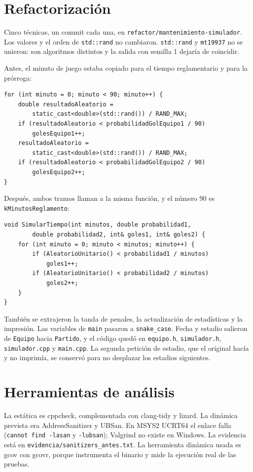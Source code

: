 \documentclass[10pt,a4paper]{article}
\begin{document}
\section{Refactorizaci\'on}
Cinco t\'ecnicas, un commit cada una, en \texttt{refactor/mantenimiento-simulador}. Los valores y el orden de \texttt{std::rand} no cambiaron. \texttt{std::rand} y \texttt{mt19937} no se unieron: son algoritmos distintos y la salida con semilla 1 dejar\'ia de coincidir.

Antes, el minuto de juego estaba copiado para el tiempo reglamentario y para la pr\'orroga:

\begin{lstlisting}
for (int minuto = 0; minuto < 90; minuto++) {
    double resultadoAleatorio =
        static_cast<double>(std::rand()) / RAND_MAX;
    if (resultadoAleatorio < probabilidadGolEquipo1 / 90)
        golesEquipo1++;
    resultadoAleatorio =
        static_cast<double>(std::rand()) / RAND_MAX;
    if (resultadoAleatorio < probabilidadGolEquipo2 / 90)
        golesEquipo2++;
}
\end{lstlisting}

Despu\'es, ambos tramos llaman a la misma funci\'on, y el n\'umero 90 es \texttt{kMinutosReglamento}:

\begin{lstlisting}
void SimularTiempo(int minutos, double probabilidad1,
        double probabilidad2, int& goles1, int& goles2) {
    for (int minuto = 0; minuto < minutos; minuto++) {
        if (AleatorioUnitario() < probabilidad1 / minutos)
            goles1++;
        if (AleatorioUnitario() < probabilidad2 / minutos)
            goles2++;
    }
}
\end{lstlisting}

Tambi\'en se extrajeron la tanda de penales, la actualizaci\'on de estad\'isticas y la impresi\'on. Las variables de \texttt{main} pasaron a \texttt{snake\_case}. Fecha y estadio salieron de \texttt{Equipo} hacia \texttt{Partido}, y el c\'odigo qued\'o en \texttt{equipo.h}, \texttt{simulador.h}, \texttt{simulador.cpp} y \texttt{main.cpp}. La segunda petici\'on de estadio, que el original hac\'ia y no imprim\'ia, se conserv\'o para no desplazar los estadios siguientes.

\section{Herramientas de an\'alisis}
La est\'atica es cppcheck, complementada con clang-tidy y lizard. La din\'amica prevista era AddressSanitizer y UBSan. En MSYS2 UCRT64 el enlace falla (\texttt{cannot find -lasan} y \texttt{-lubsan}); Valgrind no existe en Windows. La evidencia est\'a en \texttt{evidencia/sanitizers\_antes.txt}. La herramienta din\'amica usada es gcov con gcovr, porque instrumenta el binario y mide la ejecuci\'on real de las pruebas.
\end{document}
